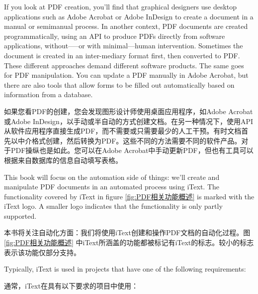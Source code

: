 
If you look at PDF creation, you’ll find that graphical designers use desktop applications such as Adobe Acrobat or Adobe InDesign to create a document in a manual or semimanual process. In another context, PDF documents are created programmatically, using an API to produce PDFs directly from software applications, without—--or with minimal—human intervention. Sometimes the document is created in an inter-mediary format first, then converted to PDF. These different approaches demand different software products. The same goes for PDF manipulation. You can update a PDF
manually in Adobe Acrobat, but there are also tools that allow forms to be filled out automatically based on information from a database.

如果您看PDF的创建，您会发现图形设计师使用桌面应用程序，如Adobe Acrobat或Adobe InDesign，以手动或半自动的方式创建文档。在另一种情况下，使用API从软件应用程序直接生成PDF，而不需要或只需要最少的人工干预。有时文档首先以中介格式创建，然后转换为PDF。这些不同的方法需要不同的软件产品。对于PDF操纵也是如此。您可以在Adobe Acrobat中手动更新PDF，但也有工具可以根据来自数据库的信息自动填写表格。

This book will focus on the automation side of things: we’ll create and manipulate PDF documents in an automated process using iText. The functionality covered by iText in figure \ref{fig:PDF相关功能概述} is marked with the iText logo. A smaller logo indicates that the functionality is only partly supported.

本书将关注自动化方面：我们将使用iText创建和操作PDF文档的自动化过程。图 \ref{fig:PDF相关功能概述} 中iText所涵盖的功能都被标记有iText的标志。较小的标志表示该功能仅部分支持。

Typically, iText is used in projects that have one of the following requirements:

通常，iText在具有以下要求的项目中使用：

